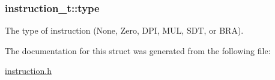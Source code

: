 \subsubsection[{\texorpdfstring{type}{type}}]{ instruction\+\_\+t\+::type}\hypertarget{structinstruction__t_a3692cf5692ee00e944ee0cb5e69190e7}{}\label{structinstruction__t_a3692cf5692ee00e944ee0cb5e69190e7}
The type of instruction (None, Zero, D\+PI, M\+UL, S\+DT, or B\+RA). 

The documentation for this struct was generated from the following file\+:\begin{DoxyCompactItemize}
\item 
\hyperlink{instruction_8h}{instruction.\+h}\end{DoxyCompactItemize}
